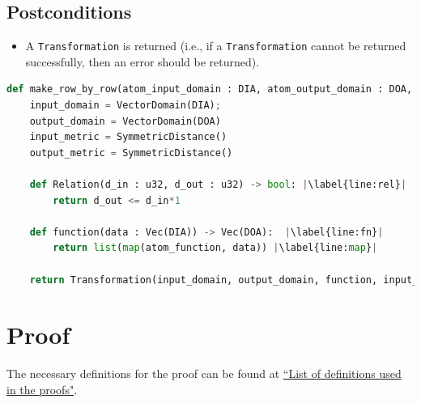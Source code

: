 \documentclass[11pt,a4paper]{article}
\begin{document}
\subsection*{Postconditions}
\begin{itemize}
    \item A \texttt{Transformation} is returned (i.e., if a \texttt{Transformation} cannot be returned successfully, then an error should be returned).
\end{itemize}


\begin{lstlisting}[language=Python, escapechar=|]
def make_row_by_row(atom_input_domain : DIA, atom_output_domain : DOA, atom_function : F):
    input_domain = VectorDomain(DIA);
    output_domain = VectorDomain(DOA)
    input_metric = SymmetricDistance()
    output_metric = SymmetricDistance()

    def Relation(d_in : u32, d_out : u32) -> bool: |\label{line:rel}|
        return d_out <= d_in*1
    
    def function(data : Vec(DIA)) -> Vec(DOA):  |\label{line:fn}|
        return list(map(atom_function, data)) |\label{line:map}|
    
    return Transformation(input_domain, output_domain, function, input_metric, output_metric, stability_relation=Relation)

\end{lstlisting}


\section{Proof}
The necessary definitions for the proof can be found at \href{https://www.overleaf.com/project/60d214e390b337703d200982}{``List of definitions used in the proofs"}.
\end{document}
